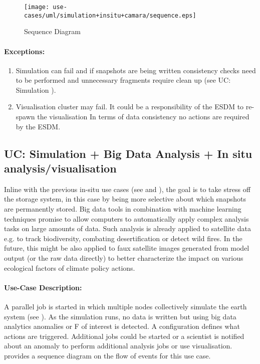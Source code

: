 \begin{figure}
	\centering
	\texttt{[image: use-cases/uml/simulation+insitu+camara/sequence.eps]}
	\caption{Sequence Diagram}
	\label{fig:sequence simulation + in-situ + cam}
\end{figure}



\paragraph{Exceptions:}
\begin{enumerate}
	\item Simulation can fail and if snapshots are being written consistency checks need to be performed and unnecessary fragments require clean up (see UC: Simulation ).
	\item Visualisation cluster may fail. It could be a responsibility of the ESDM to re-spawn the visualisation In terms of data consistency no actions are required by the ESDM.
\end{enumerate}





\subsection{UC: Simulation + Big Data Analysis + In situ analysis/visualisation}
\label{uc: simulation + big data + in-situ}

Inline with the previous in-situ use cases (see  and ), the goal is to take stress off the storage system, in this case by being more selective about which snapshots are permanently stored.
Big data tools in combination with machine learning techniques promise to allow computers to automatically apply complex analysis tasks on large amounts of data.
Such analysis is already applied to satellite data e.g. to track biodiversity, combating desertification or detect wild fires.
In the future, this might be also applied to faux satellite images  generated from model output (or the raw data directly) to better characterize the impact on various ecological factors of climate policy actions.



\paragraph{Use-Case Description:}
A parallel job is started in which multiple nodes collectively simulate the earth system (see ).
As the simulation runs, no data is written but using big data analytics anomalies or F of interest is detected.
A configuration defines what actions are triggered.
Additional jobs could be started or a scientist is notified about an anomaly to perform additional analysis jobs or use visualisation.
 provides a sequence diagram on the flow of events for this use case.

